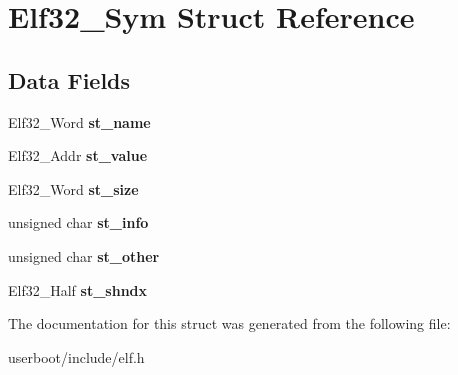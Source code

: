 \hypertarget{structElf32__Sym}{}\section{Elf32\+\_\+\+Sym Struct Reference}
\label{structElf32__Sym}
\subsection*{Data Fields}
\begin{DoxyCompactItemize}
\item 
Elf32\+\_\+\+Word {\bfseries st\+\_\+name}\hypertarget{structElf32__Sym_a6a972b30868879f8a1e071e0c45e5031}{}\label{structElf32__Sym_a6a972b30868879f8a1e071e0c45e5031}

\item 
Elf32\+\_\+\+Addr {\bfseries st\+\_\+value}\hypertarget{structElf32__Sym_abf8ff76884bc5e2acb5f7eb42f733c2e}{}\label{structElf32__Sym_abf8ff76884bc5e2acb5f7eb42f733c2e}

\item 
Elf32\+\_\+\+Word {\bfseries st\+\_\+size}\hypertarget{structElf32__Sym_a1b410e69fecd2610bc7e58d2b0245053}{}\label{structElf32__Sym_a1b410e69fecd2610bc7e58d2b0245053}

\item 
unsigned char {\bfseries st\+\_\+info}\hypertarget{structElf32__Sym_a7d131c44ec48708b1c98f9b00ca9d528}{}\label{structElf32__Sym_a7d131c44ec48708b1c98f9b00ca9d528}

\item 
unsigned char {\bfseries st\+\_\+other}\hypertarget{structElf32__Sym_a2e1bf6bedb5180f74ea8cbaf9cedfd36}{}\label{structElf32__Sym_a2e1bf6bedb5180f74ea8cbaf9cedfd36}

\item 
Elf32\+\_\+\+Half {\bfseries st\+\_\+shndx}\hypertarget{structElf32__Sym_a46e54847ab00fbea62df8ee5dff8dec6}{}\label{structElf32__Sym_a46e54847ab00fbea62df8ee5dff8dec6}

\end{DoxyCompactItemize}


The documentation for this struct was generated from the following file\+:\begin{DoxyCompactItemize}
\item 
userboot/include/elf.\+h\end{DoxyCompactItemize}
